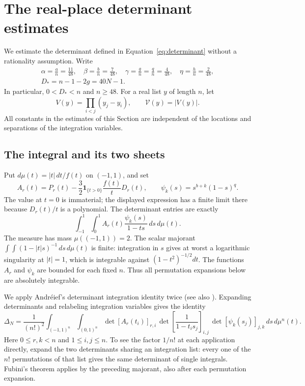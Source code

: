 \section{The real-place determinant estimates}\label{sec:real-place}

We estimate the determinant defined in Equation~\eqref{eq:determinant}
without a rationality assumption.  Write
\begin{equation}\label{eq:real-normalized-parameters}
 \begin{gathered}
 \alpha=\frac an=\frac{11}{48},\quad
 \beta=\frac bn=\frac7{48},\quad
 \gamma=\frac gn=\frac qn=\frac4{48},\quad
 \eta=\frac hn=\frac2{48},\\
 D_*=n-1-2g=40N-1.
 \end{gathered}
\end{equation}
In particular, $0<D_*<n$ and $n\ge48$.  For a real list $y$ of
length $n$, let
\[
 V(y)=\prod_{i<j}(y_j-y_i),\qquad \mathcal V(y)=|V(y)|.
\]
All constants in the estimates of this Section are independent of the
locations and separations of the integration variables.

\subsection{The integral and its two sheets}

Put $d\mu(t)=|t|\,dt/f(t)$ on $(-1,1)$, and set
\[
 A_r(t)=P_r(t)-\frac32\boldsymbol 1_{\{t>0\}}\frac{f(t)}tD_r(t),
 \qquad \psi_k(s)=s^{b+k}(1-s)^q.
\]
The value at $t=0$ is immaterial; the displayed expression has a finite
limit there because $D_r(t)/t$ is a polynomial.  The determinant entries
are exactly
\[
 \int_{-1}^1\int_0^1 A_r(t)\frac{\psi_k(s)}{1-ts}\,ds\,d\mu(t).
\]
The measure has mass $\mu((-1,1))=2$.  The scalar majorant
$\int\!\int(1-|t|s)^{-1}\,ds\,d\mu(t)$ is finite: integration in $s$
gives at worst a logarithmic singularity at $|t|=1$, which is integrable
against $(1-t^2)^{-1/2}dt$.  The functions $A_r$ and $\psi_k$ are
bounded for each fixed $n$.  Thus all permutation expansions below are
absolutely integrable.

We apply Andr\'eief's determinant integration identity twice
\cite{Andreief1886} (see also \cite[Equation~(1.7) and Section~2.2]{Forrester2018Andreief}).
Expanding determinants and relabeling integration variables gives
the identity
\begin{equation}\label{eq:real-double-integral}
 \Delta_N=\frac1{(n!)^2}\int_{(-1,1)^n}\int_{(0,1)^n}
 \det[A_r(t_i)]_{r,i}\,
 \det\left[\frac1{1-t_i s_j}\right]_{i,j}\,
 \det[\psi_k(s_j)]_{j,k}\,ds\,d\mu^n(t).
\end{equation}
Here $0\le r,k<n$ and $1\le i,j\le n$.  To see the factor $1/n!$
at each application directly, expand the two determinants sharing an
integration list: every one of the $n!$ permutations of that list gives
the same determinant of single integrals.  Fubini's theorem applies by
the preceding majorant, also after each permutation expansion.

